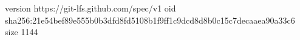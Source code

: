 version https://git-lfs.github.com/spec/v1
oid sha256:21e54bef89e555b0b3dfd8fd5108b1f9ff1c9dcd8d8b0c15c7decaaea90a33c6
size 1144

